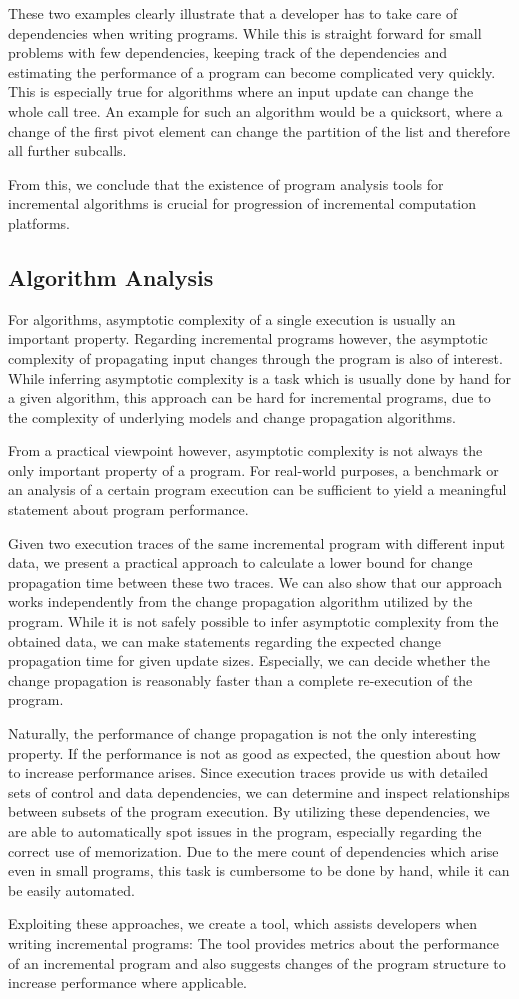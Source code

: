 These two examples clearly illustrate that a developer has to take care of  dependencies when writing programs. While this is straight forward for small problems with few dependencies, keeping track of the dependencies and estimating the performance of a program can become complicated very quickly. This is especially true for algorithms where an input update can change the whole call tree. An example for such an algorithm would be a quicksort\cite{hoare1962quicksort}, where a change of the first pivot element can change the partition of the list and therefore all further subcalls. 

From this, we conclude that the existence of program analysis tools for incremental algorithms is crucial for progression of incremental computation platforms. 

\subsection{Algorithm Analysis}

For algorithms, asymptotic complexity of a single execution is usually an important property. Regarding incremental programs however, the asymptotic complexity of propagating input changes through the program is also of interest. While inferring asymptotic complexity is a task which is usually done by hand for a given algorithm, this approach can be hard for incremental programs, due to the complexity of underlying models and change propagation algorithms. 

From a practical viewpoint however, asymptotic complexity is not always the only important property of a program. For real-world purposes, a benchmark or an analysis of a certain program execution can be sufficient to yield a meaningful statement about program performance. 

Given two execution traces of the same incremental program with different input data, we present a practical approach to calculate a lower bound for change propagation time between these two traces. We can also show that our approach works independently from the change propagation algorithm utilized by the program. While it is not safely possible to infer asymptotic complexity from the obtained data, we can make statements regarding the expected change propagation time for given update sizes. Especially, we can decide whether the change propagation is reasonably faster than a complete re-execution of the program. 

Naturally, the performance of change propagation is not the only interesting property. If the performance is not as good as expected, the question about how to increase performance arises. Since execution traces provide us with detailed sets of control and data dependencies, we can determine and inspect relationships between subsets of the program execution. By utilizing these dependencies, we are able to automatically spot issues in the program, especially regarding the correct use of memorization. Due to the mere count of dependencies which arise even in small programs, this task is cumbersome to be done by hand, while it can be easily automated. 

Exploiting these approaches, we create a tool, which assists developers when writing incremental programs: The tool provides metrics about the performance of an incremental program and also suggests changes of the program structure to increase performance where applicable. 